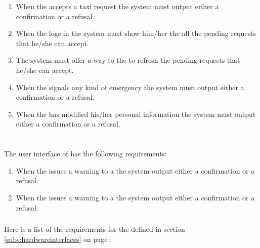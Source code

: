 \begin{enumerate} [resume*]

\item When the  accepts a taxi request the system must output either a confirmation or a refusal.

\item When the  logs in the system must show him/her the all the pending requests that he/she can accept.

\item The system must offer a way to the  to refresh the pending requests that he/she can accept.

\item When the  signals any kind of emergency the system must output either a confirmation or a refusal.

\item When the  has modified his/her personal information the system must output either a confirmation or a refusal.

\end{enumerate}

\paragraph{} \hfill \\
The user interface of  has the following requirements:

\begin{enumerate} [resume*]

\item When the  issues a warning to a  the system output either a confirmation or a refusal.

\item When the  issues a warning to a  the system output either a confirmation or a refusal.

\end{enumerate}


\subsubsection{} %
Here is a list of the requirements for the  defined in section \ref{subs:hardwareinterfaces} on page \pageref{subs:hardwareinterfaces}:

